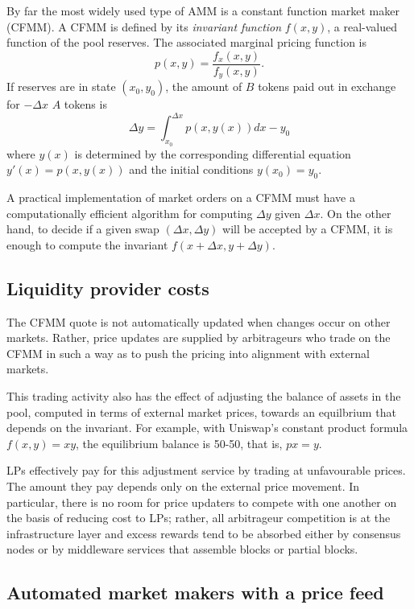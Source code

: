 \documentclass[a4paper,10pt]{article}
\theoremstyle{remark}
\begin{document}
By far the most widely used type of AMM is a constant function market maker (CFMM). A CFMM is defined by its \emph{invariant function} $f(x,y)$, a real-valued function of the pool reserves.
%
The associated marginal pricing function is 
\[
  p(x,y) = \frac{f_x(x,y)}{f_y(x,y)}.
\]
If reserves are in state $(x_0,y_0)$, the amount of $B$ tokens paid out in exchange for $-\Delta x$ $A$ tokens is
\[
  \Delta y = \int_{x_0}^{\Delta x} p(x,y(x))dx - y_0
\]
where $y(x)$ is determined by the corresponding differential equation $y'(x) = p(x,y(x))$ and the initial conditions $y(x_0)=y_0$.

A practical implementation of market orders on a CFMM must have a computationally efficient algorithm for computing $\Delta y$ given $\Delta x$.
%
On the other hand, to decide if a given swap $(\Delta x, \Delta y)$ will be accepted by a CFMM, it is enough to compute the invariant $f(x+\Delta x,y+\Delta y)$.

\subsection{Liquidity provider costs}

The CFMM quote is not automatically updated when changes occur on other markets. 
%
Rather, price updates are supplied by arbitrageurs who trade on the CFMM in such a way as to push the pricing into alignment with external markets. 

This trading activity also has the effect of adjusting the balance of assets in the pool, computed in terms of external market prices, towards an equilbrium that depends on the invariant. For example, with Uniswap's constant product formula $f(x,y)=xy$, the equilibrium balance is 50-50, that is, $px=y$.

LPs effectively pay for this adjustment service by trading at unfavourable prices. 
%
The amount they pay depends only on the external price movement.
%
In particular, there is no room for price updaters to compete with one another on the basis of reducing cost to LPs; rather, all arbitrageur competition is at the infrastructure layer and excess rewards tend to be absorbed either by consensus nodes or by middleware services that assemble blocks or partial blocks.

\subsection{Automated market makers with a price feed}
\label{price-feed}
\end{document}
